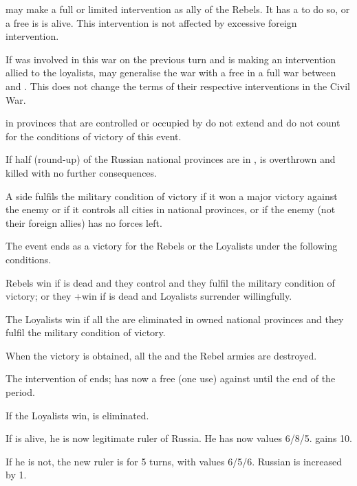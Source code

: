 \phdipl

\aparag \POL may make a full or limited intervention as ally of the Rebels. It
has a \CB to do so, or a free \CB is \leaderDmitry is alive. This
intervention is not affected by excessive foreign intervention.

\aparag If \POL was involved in this war on the previous turn and \SUE is
making an intervention allied to the loyalists, \POL may generalise the war
with a free \CB in a full war between \SUE and \POL. This does not change the
terms of their respective interventions in the Civil War.

\phpaix

\aparag \REVOLT in provinces that are controlled or occupied by \POL do not
extend and do not count for the conditions of victory of this event.

\aparag If half (round-up) of the Russian national provinces are in \REVOLT ,
 is overthrown and killed with no further
consequences.


\aparag A side fulfils the military condition of victory if it won a major
victory against the enemy or if it controls all cities in national provinces,
or if the enemy (not their foreign allies) has no forces left.

\aparag The event ends as a victory for the Rebels or the Loyalists under the
following conditions.

\bparag Rebels win if  is dead and they control
\villeMoscou and they fulfil the military condition of victory; or they +win
if  is dead and Loyalists surrender willingfully.

\bparag The Loyalists win if all the \REVOLT are eliminated in owned national
provinces and they fulfil the military condition of victory.

\bparag When the victory is obtained, all the \REVOLT and the Rebel armies are
destroyed.

\bparag The intervention of \SUE ends; \RUS has now a free \CB (one use)
against \SUE until the end of the period.

\aparag If the Loyalists win, \leaderDmitry is eliminated.

\bparag If  is alive, he is now legitimate ruler of
Russia. He has now values 6/8/5.  \RUS gains 10\PV.

\bparag If he is not, the new ruler is \monarqueRomanov for 5 turns, with
values 6/5/6. Russian \STAB is increased by 1.

